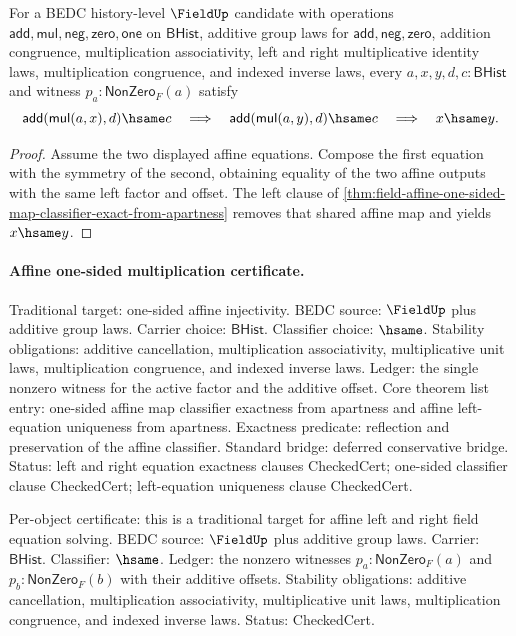 \begin{theorem}
\label{thm:field-affine-left-equation-solution-unique-from-apartness}
For a BEDC history-level $\FieldUp$ candidate with operations
$\mathsf{add},\mathsf{mul},\mathsf{neg},\mathsf{zero},\mathsf{one}$ on
$\mathsf{BHist}$, additive group laws for
$\mathsf{add},\mathsf{neg},\mathsf{zero}$, addition congruence,
multiplication associativity, left and right multiplicative identity laws,
multiplication congruence, and indexed inverse laws, every
$a,x,y,d,c:\mathsf{BHist}$ and witness $p_a:\mathsf{NonZero}_F(a)$ satisfy
$$
\mathsf{add}(\mathsf{mul}(a,x),d)\hsame c
\quad\Longrightarrow\quad
\mathsf{add}(\mathsf{mul}(a,y),d)\hsame c
\quad\Longrightarrow\quad
x\hsame y.
$$
\end{theorem}
\begin{proof}
Assume the two displayed affine equations. Compose the first equation with
the symmetry of the second, obtaining equality of the two affine outputs with
the same left factor and offset. The left clause of
\autoref{thm:field-affine-one-sided-map-classifier-exact-from-apartness}
removes that shared affine map and yields $x\hsame y$.
\end{proof}

\paragraph{Affine one-sided multiplication certificate.}
Traditional target: one-sided affine injectivity. BEDC source: $\FieldUp$ plus
additive group laws. Carrier choice: $\mathsf{BHist}$. Classifier choice:
$\hsame$. Stability obligations: additive cancellation, multiplication
associativity, multiplicative unit laws, multiplication congruence, and indexed
inverse laws. Ledger: the single nonzero witness for the active factor and the
additive offset. Core theorem list entry: one-sided affine map classifier
exactness from apartness and affine left-equation uniqueness from apartness.
Exactness predicate: reflection and preservation of the affine classifier.
Standard bridge: deferred conservative bridge. Status: left and right equation
exactness clauses CheckedCert; one-sided classifier clause CheckedCert;
left-equation uniqueness clause CheckedCert.

Per-object certificate: this is a traditional target for affine left and right
field equation solving. BEDC source: $\FieldUp$ plus additive group laws.
Carrier: $\mathsf{BHist}$. Classifier: $\hsame$. Ledger: the nonzero witnesses
$p_a:\mathsf{NonZero}_F(a)$ and $p_b:\mathsf{NonZero}_F(b)$ with their additive
offsets. Stability obligations: additive cancellation, multiplication
associativity, multiplicative unit laws, multiplication congruence, and indexed
inverse laws. Status: CheckedCert.

